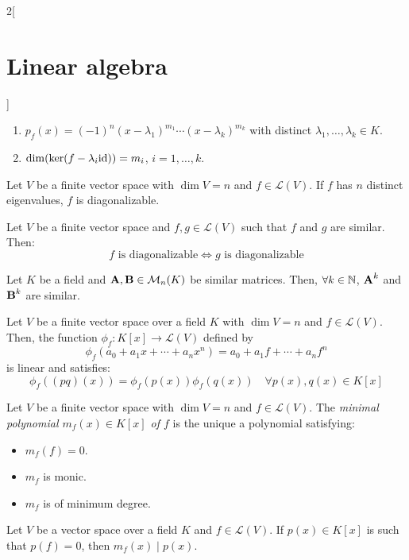 \documentclass[../../../main.tex]{subfiles}
\begin{document}
\begin{multicols}{2}[\section{Linear algebra}]
\begin{theorem}
\begin{enumerate}
      \item $p_f(x)=(-1)^n(x-\lambda_1)^{m_1}\cdots(x-\lambda_k)^{m_k}$ with distinct $\lambda_1,\ldots,\lambda_k\in K$.
      \item $\dim(\ker(f-\lambda_i \mathrm{id}))=m_i$, $i=1,\ldots,k$.
    \end{enumerate}
  \end{theorem}
  \begin{corollary}
    Let $V$ be a finite vector space with $\dim V=n$ and $f\in\mathcal{L}(V)$. If $f$ has $n$ distinct eigenvalues, $f$ is diagonalizable.
  \end{corollary}
  \begin{prop}
    Let $V$ be a finite vector space and $f,g\in\mathcal{L}(V)$ such that $f$ and $g$ are similar. Then: $$f\text{ is diagonalizable}\iff g\text{ is diagonalizable}$$
  \end{prop}
  \begin{lemma}
    Let $K$ be a field and $\boldsymbol{\mathrm{A}},\boldsymbol{\mathrm{B}}\in\mathcal{M}_n(K)$ be similar matrices. Then, $\forall k\in\mathbb{N}$, $\boldsymbol{\mathrm{A}}^k$ and $\boldsymbol{\mathrm{B}}^k$ are similar.
  \end{lemma}
  \begin{lemma}
    Let $V$ be a finite vector space over a field $K$ with $\dim V=n$ and $f\in\mathcal{L}(V)$. Then, the function $\phi_f:K[x]\rightarrow\mathcal{L}(V)$ defined by $$\phi_f(a_0+a_1x+\cdots+a_nx^n)=a_0+a_1f+\cdots+a_nf^n$$
    is linear and satisfies: $$\phi_f((pq)(x))=\phi_f(p(x))\phi_f(q(x))\quad\forall p(x),q(x)\in K[x]$$
  \end{lemma}
  \begin{definition}
    Let $V$ be a finite vector space with $\dim V=n$ and $f\in\mathcal{L}(V)$. The \textit{minimal polynomial $m_f(x)\in K[x]$ of $f$} is the unique a polynomial satisfying:
    \begin{itemize}
      \item $m_f(f)=0$.
      \item $m_f$ is monic.
      \item $m_f$ is of minimum degree.
    \end{itemize}
  \end{definition}
  \begin{prop}
    Let $V$ be a vector space over a field $K$ and $f\in\mathcal{L}(V)$. If $p(x)\in K[x]$ is such that $p(f)=0$, then $m_f(x)\mid p(x)$.
  \end{prop}

\end{multicols}
\end{document}
